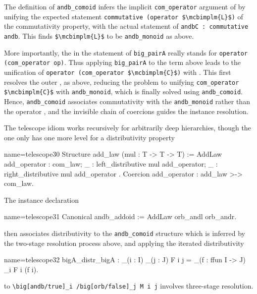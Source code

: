 The definition of \lstinline/andb_comoid/ infers the implicit
\lstinline/com_operator/ argument  of  by
unifying the expected statement
\lstinline/commutative (operator $\mcbimplm{L}$)/
of the commutativity property, with the actual
statement of \lstinline/andbC : commutative andb/. This finds
\lstinline/$\mcbimplm{L}$/ to be \lstinline/andb_monoid/ as above.

More importantly, the  in the statement of \lstinline/big_pairA/
really stands for \lstinline/operator (com_operator op)/. Thus
applying \lstinline/big_pairA/ to the term above leads to the
unification of \lstinline/operator (com_operator $\mcbimplm{C}$)/ with
. This first resolves the outer , as above, reducing the
problem to unifying \lstinline/com_operator $\mcbimplm{C}$/ with
\lstinline/andb_monoid/, which is finally solved using
\lstinline/andb_comoid/.  Hence, \lstinline/andb_comoid/ associates
commutativity with the  \lstinline/andb_monoid/ rather than the
operator , and the invisible chain of coercions guides the
instance resolution.

The telescope idiom works recursively for arbitrarily deep
hierarchies, though the  one only has one more level for a
distributivity property

\begin{coq}{name=telescope30}{}
Structure add_law (mul : T -> T -> T) := AddLaw {
  add_operator : com_law;
  _ : left_distributive mul add_operator;
  _ : right_distributive mul add_operator
}.
Coercion add_operator : add_law >-> com_law.
\end{coq}

The instance declaration

\begin{coq}{name=telescope31}{}
Canonical andb_addoid := AddLaw orb_andl orb_andr.
\end{coq}
then associates distributivity to the \lstinline/andb_comoid/
structure which is inferred by the two-stage resolution process above,
and applying the iterated distributivity

\begin{coq}{name=telescope32}{}
bigA_distr_bigA :
  _(i : I) _(j : J) F i j
    = _(f : {ffun I -> J}) _i F i (f i).
\end{coq}
to \lstinline!\big[andb/true]_i /big[orb/false]_j M i j! involves
three-stage resolution.

